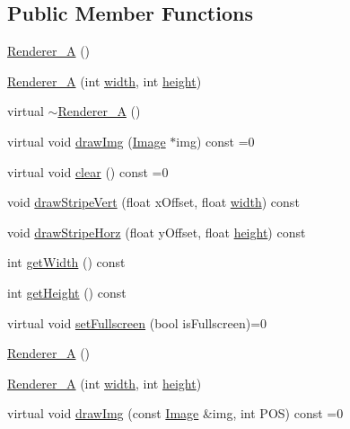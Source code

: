 \subsection*{Public Member Functions}
\begin{DoxyCompactItemize}
\item 
\hyperlink{class_renderer___a_a718e5ed623321a960f15541de5e70b3e}{Renderer\-\_\-\-A} ()
\item 
\hyperlink{class_renderer___a_afaef918b4d9abdb929d9a437d00e3eb8}{Renderer\-\_\-\-A} (int \hyperlink{class_renderer___a_a0ca3fbb31eb776ee00b70536f267dfe7}{width}, int \hyperlink{class_renderer___a_a36d0dfb8eeccad9e1ff0b0c461632f6a}{height})
\item 
virtual \hyperlink{class_renderer___a_a45c8fd733be7578754cedf95a9f8986e}{$\sim$\-Renderer\-\_\-\-A} ()
\item 
virtual void \hyperlink{class_renderer___a_ae17c1f0f1858f8088dc04a4b04482d4e}{draw\-Img} (\hyperlink{class_image}{Image} $\ast$img) const =0
\item 
virtual void \hyperlink{class_renderer___a_a65b10c7ee561d9a206ea931cc50c3e91}{clear} () const =0
\item 
void \hyperlink{class_renderer___a_af817037b1ebd9906e5f4faee1637bdf0}{draw\-Stripe\-Vert} (float x\-Offset, float \hyperlink{class_renderer___a_a0ca3fbb31eb776ee00b70536f267dfe7}{width}) const 
\item 
void \hyperlink{class_renderer___a_a70ea4a1396787e8a3c59c848a6aeabcd}{draw\-Stripe\-Horz} (float y\-Offset, float \hyperlink{class_renderer___a_a36d0dfb8eeccad9e1ff0b0c461632f6a}{height}) const 
\item 
int \hyperlink{class_renderer___a_a79fb640a6c4a733647f3bc5cd96c3bad}{get\-Width} () const 
\item 
int \hyperlink{class_renderer___a_a69aeb74354637f5d9d7a5508f00dde33}{get\-Height} () const 
\item 
virtual void \hyperlink{class_renderer___a_a7ebd9c4c5edba231c6014bcd28248016}{set\-Fullscreen} (bool is\-Fullscreen)=0
\item 
\hyperlink{class_renderer___a_a718e5ed623321a960f15541de5e70b3e}{Renderer\-\_\-\-A} ()
\item 
\hyperlink{class_renderer___a_afaef918b4d9abdb929d9a437d00e3eb8}{Renderer\-\_\-\-A} (int \hyperlink{class_renderer___a_a0ca3fbb31eb776ee00b70536f267dfe7}{width}, int \hyperlink{class_renderer___a_a36d0dfb8eeccad9e1ff0b0c461632f6a}{height})
\item 
virtual void \hyperlink{class_renderer___a_a9702e174f4c76edd6059e3593ce03291}{draw\-Img} (const \hyperlink{class_image}{Image} \&img, int P\-O\-S) const =0

\end{DoxyCompactItemize}
